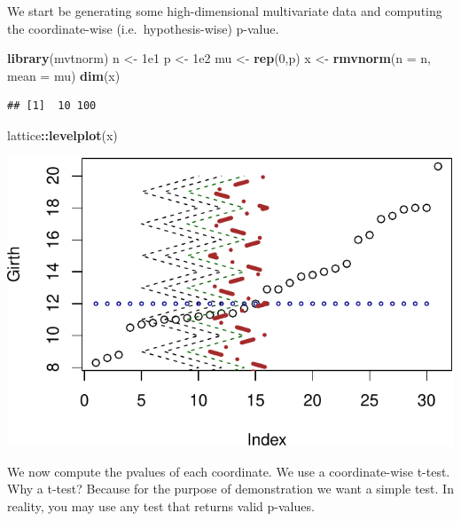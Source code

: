 \documentclass[]{book}
\newenvironment{Shaded}{\begin{snugshade}}{\end{snugshade}}
\newcommand{\KeywordTok}[1]{\textcolor[rgb]{0.13,0.29,0.53}{\textbf{#1}}}
\newcommand{\DataTypeTok}[1]{\textcolor[rgb]{0.13,0.29,0.53}{#1}}
\newcommand{\DecValTok}[1]{\textcolor[rgb]{0.00,0.00,0.81}{#1}}
\newcommand{\FloatTok}[1]{\textcolor[rgb]{0.00,0.00,0.81}{#1}}
\newcommand{\StringTok}[1]{\textcolor[rgb]{0.31,0.60,0.02}{#1}}
\newcommand{\ControlFlowTok}[1]{\textcolor[rgb]{0.13,0.29,0.53}{\textbf{#1}}}
\newcommand{\OperatorTok}[1]{\textcolor[rgb]{0.81,0.36,0.00}{\textbf{#1}}}
\newcommand{\NormalTok}[1]{#1}
\theoremstyle{definition}
\theoremstyle{definition}
\theoremstyle{definition}
\theoremstyle{remark}
\begin{document}
We start be generating some high-dimensional multivariate data and
computing the coordinate-wise (i.e.~hypothesis-wise) p-value.

\begin{Shaded}
\begin{Highlighting}[]
\KeywordTok{library}\NormalTok{(mvtnorm)}
\NormalTok{n <-}\StringTok{ }\FloatTok{1e1}
\NormalTok{p <-}\StringTok{ }\FloatTok{1e2}
\NormalTok{mu <-}\StringTok{ }\KeywordTok{rep}\NormalTok{(}\DecValTok{0}\NormalTok{,p)}
\NormalTok{x <-}\StringTok{ }\KeywordTok{rmvnorm}\NormalTok{(}\DataTypeTok{n =}\NormalTok{ n, }\DataTypeTok{mean =}\NormalTok{ mu)}
\KeywordTok{dim}\NormalTok{(x)}
\end{Highlighting}
\end{Shaded}

\begin{verbatim}
## [1]  10 100
\end{verbatim}

\begin{Shaded}
\begin{Highlighting}[]
\NormalTok{lattice}\OperatorTok{::}\KeywordTok{levelplot}\NormalTok{(x)}
\end{Highlighting}
\end{Shaded}

\includegraphics[width=0.5\linewidth]{Rcourse_files/figure-latex/unnamed-chunk-211-1}

We now compute the pvalues of each coordinate. We use a coordinate-wise
t-test. Why a t-test? Because for the purpose of demonstration we want a
simple test. In reality, you may use any test that returns valid
p-values.

\begin{Shaded}
\end{Shaded}
\end{document}
